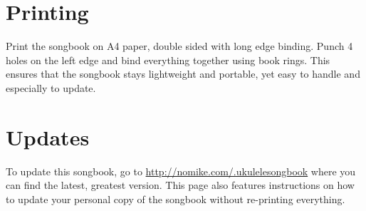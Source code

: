 \section*{Printing}
Print the songbook on A4 paper, double sided with long edge binding. Punch 4 holes on the left edge and bind everything together using book rings. This ensures that the songbook stays lightweight and portable, yet easy to handle and especially to update.

\section*{Updates}
To update this songbook, go to \url{http://nomike.com/.ukulelesongbook} where you can find the latest, greatest version.
This page also features instructions on how to update your personal copy of the songbook without re-printing everything.

